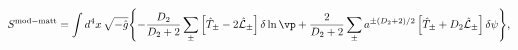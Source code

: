 \begin{equation}
    \label{modmatteinst}
    S^{\rm mod-matt} =
    \int d^4x\, \sqrt{-\hat g}  \Biggl\{
    -{D_2\over D_2+2}
    \sum_\pm \left[\hat{ T}_\pm -2 \hat{\cal L}_\pm
    \right]    \delta \ln \vp
    +{2\over D_2+2}
    \sum_\pm a^{\pm (D_2+2)/2} \left[ \hat{T}_\pm +D_2 \hat{\cal L}_\pm
    \right] \delta    \psi
    \Biggr\},
\end{equation}


